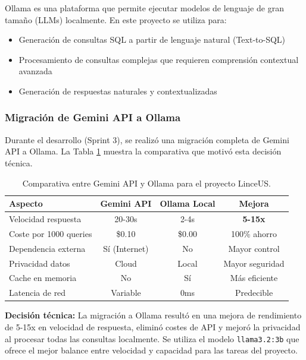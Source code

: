 Ollama es una plataforma que permite ejecutar modelos de lenguaje de gran tamaño (LLMs) localmente. En este proyecto se utiliza para:

\begin{itemize}
    \item Generación de consultas SQL a partir de lenguaje natural (Text-to-SQL)
    \item Procesamiento de consultas complejas que requieren comprensión contextual avanzada
    \item Generación de respuestas naturales y contextualizadas
\end{itemize}

\subsubsection{Migración de Gemini API a Ollama}

Durante el desarrollo (Sprint 3), se realizó una migración completa de Gemini API a Ollama. La Tabla \ref{tab:comp-llms} muestra la comparativa que motivó esta decisión técnica.

\begin{table}[h]
\centering
\begin{tabular}{|l|c|c|c|}
\hline
\textbf{Aspecto} & \textbf{Gemini API} & \textbf{Ollama Local} & \textbf{Mejora} \\ \hline
Velocidad respuesta & 20-30s & 2-4s & \textbf{5-15x} \\ \hline
Coste por 1000 queries & \$0.10 & \$0.00 & 100\% ahorro \\ \hline
Dependencia externa & Sí (Internet) & No & Mayor control \\ \hline
Privacidad datos & Cloud & Local & Mayor seguridad \\ \hline
Cache en memoria & No & Sí & Más eficiente \\ \hline
Latencia de red & Variable & 0ms & Predecible \\ \hline
\end{tabular}
\caption{Comparativa entre Gemini API y Ollama para el proyecto LinceUS.}
\label{tab:comp-llms}
\end{table}

\textbf{Decisión técnica:} La migración a Ollama resultó en una mejora de rendimiento de 5-15x en velocidad de respuesta, eliminó costes de API y mejoró la privacidad al procesar todas las consultas localmente. Se utiliza el modelo \texttt{llama3.2:3b} que ofrece el mejor balance entre velocidad y capacidad para las tareas del proyecto.

